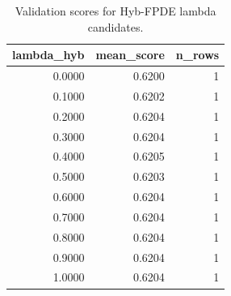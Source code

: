 \begin{table}[t]
\caption{Validation scores for Hyb-FPDE lambda candidates.}
\label{tab:lambda_distribution_computed}
\centering
\begin{tabular}{rrr}
\toprule
lambda\_hyb & mean\_score & n\_rows \\
\midrule
0.0000 & 0.6200 & 1 \\
0.1000 & 0.6202 & 1 \\
0.2000 & 0.6204 & 1 \\
0.3000 & 0.6204 & 1 \\
0.4000 & 0.6205 & 1 \\
0.5000 & 0.6203 & 1 \\
0.6000 & 0.6204 & 1 \\
0.7000 & 0.6204 & 1 \\
0.8000 & 0.6204 & 1 \\
0.9000 & 0.6204 & 1 \\
1.0000 & 0.6204 & 1 \\
\bottomrule
\end{tabular}

\end{table}
